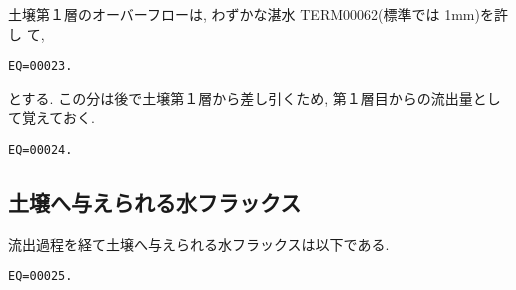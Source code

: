 土壌第１層のオーバーフローは, わずかな湛水 TERM00062(標準では 1mm)を許し
て,
\begin{verbatim}
EQ=00023.
\end{verbatim}
とする. この分は後で土壌第１層から差し引くため, 第１層目からの流出量とし
て覚えておく.
\begin{verbatim}
EQ=00024.
\end{verbatim}

\subsection{土壌へ与えられる水フラックス}

流出過程を経て土壌へ与えられる水フラックスは以下である.
\begin{verbatim}
EQ=00025.
\end{verbatim}

